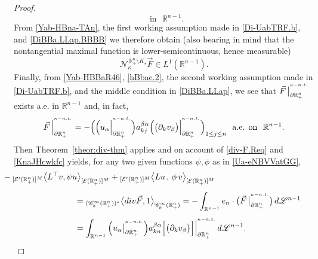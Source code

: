 \documentclass[10pt,a4paper]{amsart}
\begin{document}
\begin{proof}
\begin{equation}
\,\,\text{ in }\,\,{\mathbb{R}}^{n-1}.
\end{equation}
%
From \eqref{Yab-HBna-TAn}, the first working assumption made in \eqref{Di-UabTRF.b}, and \eqref{DiBBa.LLap.BBBB}
we therefore obtain (also bearing in mind that the nontangential maximal function is lower-semicontinuous, hence 
measurable)
%
\begin{equation}\label{Yab-HBna-TAn.2}
{\mathcal{N}}^{\,\mathbb{R}^{n}_{+}\setminus K_\star}_{\kappa}\vec{F}\in L^1({\mathbb{R}}^{n-1}).
\end{equation}
%
Finally, from \eqref{Yab-HBBaR46}, \eqref{hBbac.2}, the second working assumption made in \eqref{Di-UabTRF.b}, 
and the middle condition in \eqref{DiBBa.LLap}, we see that
$\vec{F}\,\big|^{{}^{\kappa-{\rm n.t.}}}_{\partial\mathbb{R}^n_+}$
exists a.e. in ${\mathbb{R}}^{n-1}$ and, in fact, 
%
\begin{equation}\label{KnaJHcwkfc}
\vec{F}\,\Big|^{{}^{\kappa-{\rm n.t.}}}_{\partial\mathbb{R}^n_+}
=-\Big(\Big(u_\alpha\Big|^{{}^{\kappa-{\rm n.t.}}}_{\partial\mathbb{R}^n_+}\Big)
a^{\beta\alpha}_{kj}\Big(\big(\partial_k v_{\beta}\big)
\Big|^{{}^{\kappa-{\rm n.t.}}}_{\partial\mathbb{R}^n_+}\Big)_{1\leq j\le n}
\,\,\text{ a.e. on }\,\,{\mathbb{R}}^{n-1}.
\end{equation}
%
Then Theorem~\ref{theor:div-thm} applies and on account of \eqref{div-F.Req}
and \eqref{KnaJHcwkfc} yields, for any two given functions $\psi,\phi$ 
as in \eqref{Ua-eNBVVatGG},
%
\begin{align}\label{Uahg-ihGPPa4}
&\hskip -0.40in
-{}_{[{\mathcal{E}}'(\mathbb{R}^{n}_{+})]^M}\big\langle L^{\top}v,
\psi u\big\rangle_{[{\mathcal{E}}(\mathbb{R}^{n}_{+})]^M}
+{}_{[{\mathcal{E}}'(\mathbb{R}^{n}_{+})]^M}\big\langle Lu\,,\,
\phi\,v\big\rangle_{[{\mathcal{E}}(\mathbb{R}^{n}_{+})]^M}
\nonumber\\[4pt]
&\hskip 0.80in
={}_{(\mathscr{C}_b^\infty(\mathbb{R}^n_+))^*}\big\langle{\rm div}\vec{F},1
\big\rangle_{\mathscr{C}_b^\infty(\mathbb{R}^n_+)} 
=-\int_{\mathbb{R}^{n-1}}e_n\cdot
\big(\vec F\,\big|^{{}^{\kappa-{\rm n.t.}}}_{\partial\mathbb{R}^n_+}\bigr)\,d{\mathscr{L}}^{n-1}
\nonumber\\[4pt]
&\hskip 0.80in
=\int_{\mathbb{R}^{n-1}}
\Big(u_\alpha\big|_{\partial\mathbb{R}^{n}_{+}}^{{}^{\kappa-{\rm n.t.}}}\Big)a^{\beta\alpha}_{kn}
\Big[\big(\partial_k v_{\beta}\big)
\Big]\Big|_{\partial\mathbb{R}^{n}_{+}}^{{}^{\kappa-{\rm n.t.}}}\,d{\mathscr{L}}^{n-1}.
\end{align}


\end{proof}
\end{document}
